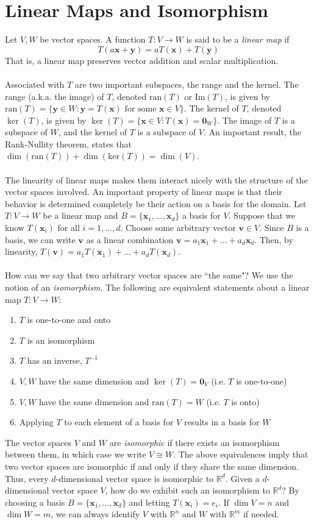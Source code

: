 \documentclass{article}
\newcommand{\R}{\mathbb{R}}
\newcommand{\tit}{\textit}
\newcommand{\tbf}{\textbf}
\newcommand{\ran}{\text{ran}}
\begin{document}
\section{Linear Maps and Isomorphism}
Let $V,W$ be vector spaces. A function $T: V \to W$ is said to be a \tit{linear map} if 
$$T(a\tbf{x} + \tbf{y}) = aT(\tbf{x}) + T(\tbf{y})$$
That is, a linear map preserves vector addition and scalar multiplication.\\ \\
Associated with $T$ are two important subspaces, the range and the kernel. The range (a.k.a. the image) of $T$, denoted $\text{ran}(T)$ or $\text{Im}(T)$, is given by $\text{ran}(T) = \{ \tbf{y} \in W: \tbf{y} = T(\tbf{x}) \text{ for some } \tbf{x} \in V \}$. The kernel of $T$, denoted $\ker(T)$, is given by $\ker(T) = \{\tbf{x} \in V: T(\tbf{x}) = \tbf{0}_W\}$. The image of $T$ is a subspace of $W$, and the kernel of $T$ is a subspace of $V$. An important result, the Rank-Nullity theorem, states that $\dim(\text{ran}(T)) + \dim(\text{ker}(T)) = \dim(V)$.
\\ \\
The linearity of linear maps makes them interact nicely with the structure of the vector spaces involved. An important property of linear maps is that their behavior is determined completely be their action on a basis for the domain. Let $T: V \to W$ be a linear map and $B = \{\tbf{x}_1, ... , \tbf{x}_d\}$ a basis for $V$. Suppose that we know $T(\tbf{x}_i)$ for all $i = 1, ... , d$. Choose some arbitrary vector $\tbf{v} \in V$. Since $B$ is a basis, we can write $\tbf{v}$ as a linear combination $\tbf{v} = a_1\tbf{x}_1 + ... + a_d\tbf{x}_d$. Then, by linearity, $T(\tbf{v}) = a_1T(\tbf{x}_1) + ... + a_dT(\tbf{x}_d)$.
\\ \\
How can we say that two arbitrary vector spaces are ``the same"? We use the notion of an \tit{isomorphism}. The following are equivalent statements about a linear map $T: V \to W$:
\begin{enumerate}[label=(\roman*)]
\item $T$ is one-to-one and onto
\item $T$ is an isomorphism
\item $T$ has an inverse, $T^{-1}$ 
\item $V,W$ have the same dimension and $\ker(T) = \tbf{0}_V$ (i.e. $T$ is one-to-one)
\item $V,W$ have the same dimension and $\ran(T) = W$ (i.e. $T$ is onto)
\item Applying $T$ to each element of a basis for $V$ results in a basis for $W$
\end{enumerate}
The vector spaces $V$ and $W$ are \tit{isomorphic} if there exists an isomorphism between them, in which case we write $V \cong W$. The above equivalences imply that two vector spaces are isomorphic if and only if they share the same dimension. Thus, every $d$-dimensional vector space is isomorphic to $\R^d$. Given a $d$-dimensional vector space $V$, how do we exhibit such an isomorphism to $\R^d$? By choosing a basis $B = \{\tbf{x}_1, ... , \tbf{x}_d\}$ and letting $T(\tbf{x}_i) = e_i$. If $\dim V = n$ and $\dim W = m$, we can always identify $V$ with $\R^n$ and $W$ with $\R^m$ if needed. 
\end{document}
